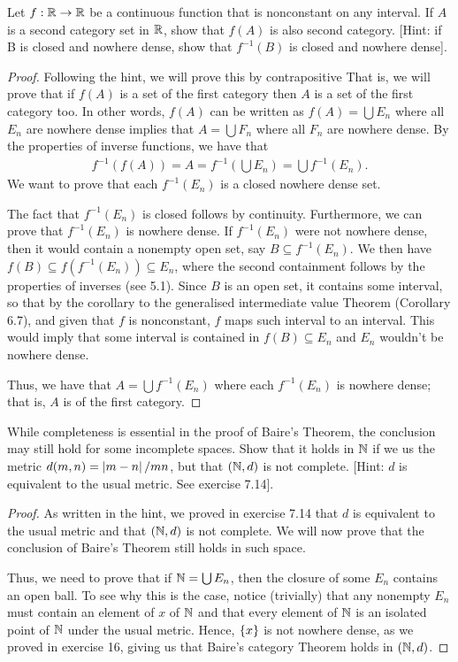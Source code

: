 \begin{exercise}{40}
Let $f: \mathbb{R} \to \mathbb{R}$ be a continuous function that is nonconstant on any interval.
If $A$ is a second category set in $\mathbb{R}$, show that $f(A)$ is also second category.
[Hint: if B is closed and nowhere dense, show that $f^{-1}(B)$ is closed and nowhere dense].
\end{exercise}
\begin{proof}
Following the hint, we will prove this by contrapositive
That is, we will prove that if $f(A)$ is a set of the first category then $A$ is a set of the first category too.
In other words, $f(A)$ can be written as $f(A) = \bigcup E_n$ where all $E_n$ are nowhere dense implies that $A = \bigcup F_n$ where all $F_n$ are nowhere dense.
By the properties of inverse functions, we have that 
\begin{align*}
    f^{-1}(f(A)) = A = f^{-1}(\bigcup E_n) = \bigcup f^{-1}(E_n).
\end{align*}
We want to prove that each $f^{-1}(E_n)$ is a closed nowhere dense set.

The fact that $f^{-1}(E_n)$ is closed follows by continuity.
Furthermore, we can prove that $f^{-1}(E_n)$ is nowhere dense.
If $f^{-1}(E_n)$ were not nowhere dense, then it would contain a nonempty open set, say $B \subseteq f^{-1}(E_n)$.
We then have $f(B) \subseteq f(f^{-1}(E_n)) \subseteq E_n$, where the second containment follows by the properties of inverses (see 5.1).
Since $B$ is an open set, it contains some interval, so that by the corollary to the generalised intermediate value Theorem (Corollary 6.7), and given that $f$ is nonconstant, $f$ maps such interval to an interval.
This would imply that some interval is contained in $f(B) \subseteq E_n$ and $E_n$ wouldn't be nowhere dense.

Thus, we have that $A = \bigcup f^{-1}(E_n)$ where each $f^{-1}(E_n)$ is nowhere dense;
that is, $A$ is of the first category.
\end{proof} 

\begin{exercise}{42}
While completeness is essential in the proof of Baire's Theorem, the conclusion may still hold for some incomplete spaces.
Show that it holds in $\mathbb{N}$ if we us the metric $d(m,n) = \left\lvert m-n\right\rvert/mn$, but that $(\mathbb{N},d)$ is not complete.
[Hint: $d$ is equivalent to the usual metric.
See exercise 7.14].
\end{exercise}
\begin{proof}
As written in the hint, we proved in exercise 7.14 that $d$ is equivalent to the usual metric and that $(\mathbb{N},d)$ is not complete.
We will now prove that the conclusion of Baire's Theorem still holds in such space.

Thus, we need to prove that if $\mathbb{N} = \bigcup E_n$, then the closure of some $E_n$ contains an open ball.
To see why this is the case, notice (trivially) that any nonempty $E_n$ must contain an element of $x$ of $\mathbb{N}$ and that every element of $\mathbb{N}$ is an isolated point of $\mathbb{N}$ under the usual metric.
Hence, $\{x\}$ is not nowhere dense, as we proved in exercise 16, giving us that Baire's category Theorem holds in $(\mathbb{N},d)$.
\end{proof} 


